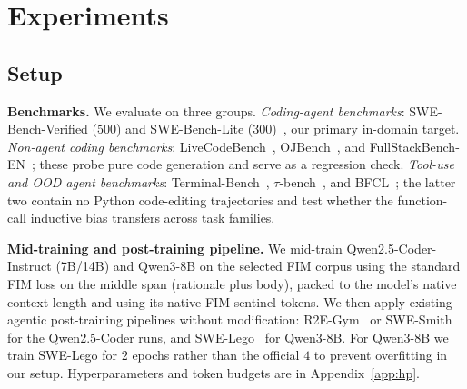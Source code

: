 
\section{Experiments}
\label{sec:exp}
\vspace{-0.5ex}

\subsection{Setup}
\label{sec:exp:setup}

\textbf{Benchmarks.} We evaluate on three groups.
\emph{Coding-agent benchmarks}: SWE-Bench-Verified ($500$) and
SWE-Bench-Lite ($300$)~\citep{swebench}, our primary in-domain target.
\emph{Non-agent coding benchmarks}: LiveCodeBench~\citep{livecodebench},
OJBench~\citep{ojbench}, and FullStackBench-EN~\citep{fullstackbench};
these probe pure code generation and serve as a regression check.
\emph{Tool-use and OOD agent benchmarks}: Terminal-Bench~\citep{terminalbench},
$\tau$-bench~\citep{taubench}, and BFCL~\citep{bfcl}; the latter two
contain no Python code-editing trajectories and test whether the
function-call inductive bias transfers across task families.

\textbf{Mid-training and post-training pipeline.}
We mid-train Qwen2.5-Coder-Instruct (7B/14B) and Qwen3-8B on the
selected FIM corpus using the standard FIM loss on the middle span
(rationale plus body), packed to the model's native context length and
using its native FIM sentinel tokens. We then apply existing agentic
post-training pipelines without modification:
R2E-Gym~\citep{r2egym} or SWE-Smith~\citep{swesmith} for the
Qwen2.5-Coder runs, and SWE-Lego~\citep{swelego} for Qwen3-8B. For
Qwen3-8B we train SWE-Lego for $2$ epochs rather than the official $4$
to prevent overfitting in our setup. Hyperparameters and token budgets
are in Appendix~\ref{app:hp}.

